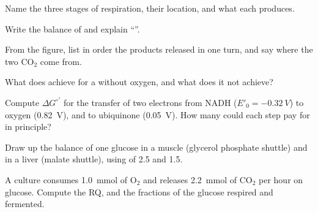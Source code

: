 \begin{exercise}[$\star$]\label{exo:b1:respiration-fermentation:1}
Name the three stages of respiration, their location, and what each
produces.
\end{exercise}

\begin{exercise}[$\star$]\label{exo:b1:respiration-fermentation:2}
Write the balance of  and explain ``''.
\end{exercise}

\begin{exercise}[$\star$]\label{exo:b1:respiration-fermentation:3}
From the  figure, list in order the products released in
one turn, and say where the two $\mathrm{CO_2}$ come from.
\end{exercise}

\begin{exercise}[$\star$]\label{exo:b1:respiration-fermentation:4}
What does  achieve for a  without oxygen, and what
does it not achieve?
\end{exercise}

\begin{exercise}[$\star\star$]\label{exo:b1:respiration-fermentation:5}
Compute $\Delta G^{\circ\prime}$ for the transfer of two electrons from
NADH ($E'_0 = \qty{-0.32}{V}$) to oxygen (\qty{+0.82}{V}), and to
ubiquinone (\qty{+0.05}{V}). How many  could each step pay for in
principle?
\end{exercise}

\begin{exercise}[$\star\star$]\label{exo:b1:respiration-fermentation:6}
Draw up the  balance of one glucose in a muscle  (glycerol
phosphate shuttle) and in a liver  (malate shuttle), using  of 2.5 and 1.5.
\end{exercise}

\begin{exercise}[$\star\star$]\label{exo:b1:respiration-fermentation:7}
A culture consumes \qty{1.0}{mmol} of $\mathrm{O_2}$ and releases
\qty{2.2}{mmol} of $\mathrm{CO_2}$ per hour on glucose. Compute the
RQ, and the fractions of the glucose respired and fermented.
\end{exercise}

